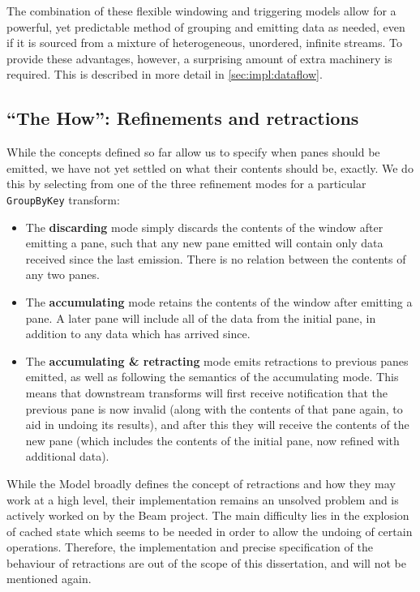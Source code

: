 The combination of these flexible windowing and triggering models allow for a powerful, yet predictable method of grouping and emitting data as needed, even if it is sourced from a mixture of heterogeneous, unordered, infinite streams.
To provide these advantages, however, a surprising amount of extra machinery is required.
This is described in more detail in \cref{sec:impl:dataflow}.

\subsection{``The How'': Refinements and retractions}\label{sec:prep:dataflow:how}

While the concepts defined so far allow us to specify when panes should be emitted, we have not yet settled on what their contents should be, exactly.
We do this by selecting from one of the three refinement modes for a particular \verb|GroupByKey| transform:
\begin{itemize}
	\item The \textbf{discarding} mode simply discards the contents of the window after emitting a pane, such that any new pane emitted will contain only data received since the last emission. There is no relation between the contents of any two panes.
	\item The \textbf{accumulating} mode retains the contents of the window after emitting a pane. A later pane will include all of the data from the initial pane, in addition to any data which has arrived since.
	\item The \textbf{accumulating \& retracting} mode emits retractions to previous panes emitted, as well as following the semantics of the accumulating mode. This means that downstream transforms will first receive notification that the previous pane is now invalid (along with the contents of that pane again, to aid in undoing its results), and after this they will receive the contents of the new pane (which includes the contents of the initial pane, now refined with additional data). 
\end{itemize}


While the Model broadly defines the concept of retractions and how they may work at a high level, their implementation remains an unsolved problem and is actively worked on by the Beam project.
The main difficulty lies in the explosion of cached state which seems to be needed in order to allow the undoing of certain operations.
Therefore, the implementation and precise specification of the behaviour of retractions are out of the scope of this dissertation, and will not be mentioned again.

